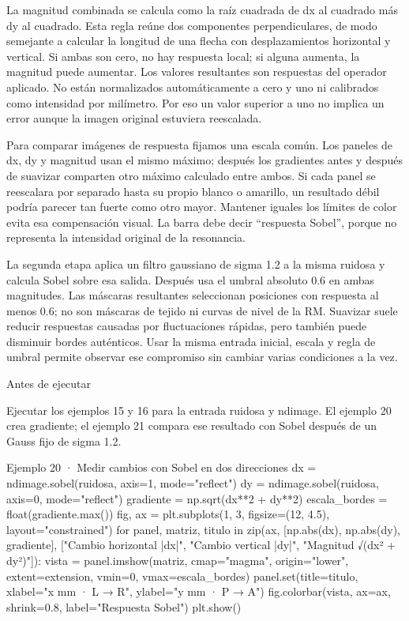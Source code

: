 La magnitud combinada se calcula como la raíz cuadrada de dx al cuadrado más dy al cuadrado. Esta regla reúne dos componentes perpendiculares, de modo semejante a calcular la longitud de una flecha con desplazamientos horizontal y vertical. Si ambas son cero, no hay respuesta local; si alguna aumenta, la magnitud puede aumentar. Los valores resultantes son respuestas del operador aplicado. No están normalizados automáticamente a cero y uno ni calibrados como intensidad por milímetro. Por eso un valor superior a uno no implica un error aunque la imagen original estuviera reescalada.


Para comparar imágenes de respuesta fijamos una escala común. Los paneles de dx, dy y magnitud usan el mismo máximo; después los gradientes antes y después de suavizar comparten otro máximo calculado entre ambos. Si cada panel se reescalara por separado hasta su propio blanco o amarillo, un resultado débil podría parecer tan fuerte como otro mayor. Mantener iguales los límites de color evita esa compensación visual. La barra debe decir “respuesta Sobel”, porque no representa la intensidad original de la resonancia.


La segunda etapa aplica un filtro gaussiano de sigma 1.2 a la misma ruidosa y calcula Sobel sobre esa salida. Después usa el umbral absoluto 0.6 en ambas magnitudes. Las máscaras resultantes seleccionan posiciones con respuesta al menos 0.6; no son máscaras de tejido ni curvas de nivel de la RM. Suavizar suele reducir respuestas causadas por fluctuaciones rápidas, pero también puede disminuir bordes auténticos. Usar la misma entrada inicial, escala y regla de umbral permite observar ese compromiso sin cambiar varias condiciones a la vez.



\begin{Idea}{Antes de ejecutar}

Ejecutar los ejemplos 15 y 16 para la entrada ruidosa y ndimage. El ejemplo 20 crea gradiente; el ejemplo 21 compara ese resultado con Sobel después de un Gauss fijo de sigma 1.2.


\end{Idea}

\begin{Codigo}{Ejemplo 20 · Medir cambios con Sobel en dos direcciones}
dx = ndimage.sobel(ruidosa, axis=1, mode="reflect")
dy = ndimage.sobel(ruidosa, axis=0, mode="reflect")
gradiente = np.sqrt(dx**2 + dy**2)
escala_bordes = float(gradiente.max())
fig, ax = plt.subplots(1, 3, figsize=(12, 4.5), layout="constrained")
for panel, matriz, titulo in zip(ax, [np.abs(dx), np.abs(dy), gradiente], ["Cambio horizontal |dx|", "Cambio vertical |dy|", "Magnitud √(dx² + dy²)"]):
    vista = panel.imshow(matriz, cmap="magma", origin="lower", extent=extension, vmin=0, vmax=escala_bordes)
    panel.set(title=titulo, xlabel="x mm · L → R", ylabel="y mm · P → A")
fig.colorbar(vista, ax=ax, shrink=0.8, label="Respuesta Sobel")
plt.show()
\end{Codigo}

